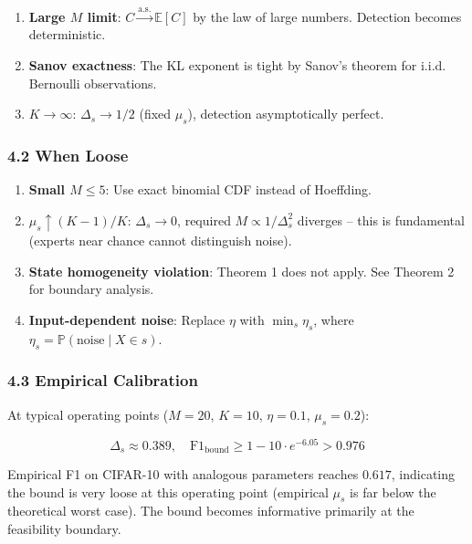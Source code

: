 \documentclass[
  12pt,
]{ctexart}
\providecommand{\tightlist}{%
  \setlength{\itemsep}{0pt}\setlength{\parskip}{0pt}}
\begin{document}
\begin{enumerate}
\def\labelenumi{\arabic{enumi}.}
\tightlist
\item
  \textbf{Large \(M\) limit}:
  \(C \xrightarrow{\text{a.s.}} \mathbb{E}[C]\) by the law of large
  numbers. Detection becomes deterministic.
\item
  \textbf{Sanov exactness}: The KL exponent is tight by Sanov's theorem
  for i.i.d. Bernoulli observations.
\item
  \textbf{\(K \to \infty\)}: \(\Delta_s \to 1/2\) (fixed \(\mu_s\)),
  detection asymptotically perfect.
\end{enumerate}

\subsubsection{4.2 When Loose}\label{when-loose}

\begin{enumerate}
\def\labelenumi{\arabic{enumi}.}
\tightlist
\item
  \textbf{Small \(M \leq 5\)}: Use exact binomial CDF instead of
  Hoeffding.
\item
  \textbf{\(\mu_s \uparrow (K-1)/K\)}: \(\Delta_s \to 0\), required
  \(M \propto 1/\Delta_s^2\) diverges -- this is fundamental (experts
  near chance cannot distinguish noise).
\item
  \textbf{State homogeneity violation}: Theorem 1 does not apply. See
  Theorem 2 for boundary analysis.
\item
  \textbf{Input-dependent noise}: Replace \(\eta\) with
  \(\min_s \eta_s\), where
  \(\eta_s = \mathbb{P}(\text{noise} \mid X \in s)\).
\end{enumerate}

\subsubsection{4.3 Empirical Calibration}\label{empirical-calibration}

At typical operating points (\(M=20\), \(K=10\), \(\eta=0.1\),
\(\mu_s=0.2\)):

\[\Delta_s \approx 0.389, \quad \text{F1}_{\text{bound}} \geq 1 - 10 \cdot e^{-6.05} > 0.976\]

Empirical F1 on CIFAR-10 with analogous parameters reaches \(0.617\),
indicating the bound is very loose at this operating point (empirical
\(\mu_s\) is far below the theoretical worst case). The bound becomes
informative primarily at the feasibility boundary.
\end{document}
